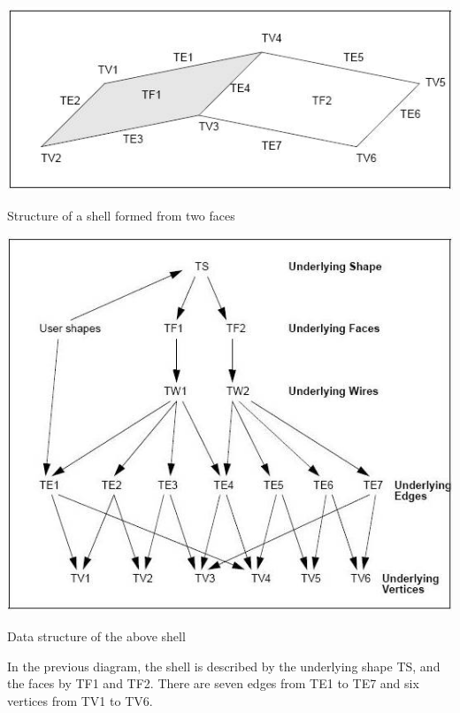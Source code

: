 \begin{DoxyImage}
\begin{center}
 \includegraphics[width=\textwidth,height=\textheight/2,keepaspectratio=true]{modeling_data_image011.png}
\end{center}
\caption{Structure of a shell formed from two faces}
\end{DoxyImage}



\begin{DoxyImage}
\begin{center}
 \includegraphics[width=\textwidth,height=\textheight/2,keepaspectratio=true]{modeling_data_image012.png}
\end{center}
\caption{Data structure of the above shell}
\end{DoxyImage}


In the previous diagram, the shell is described by the underlying shape TS, and the faces by T\+F1 and T\+F2. There are seven edges from T\+E1 to T\+E7 and six vertices from T\+V1 to T\+V6.

